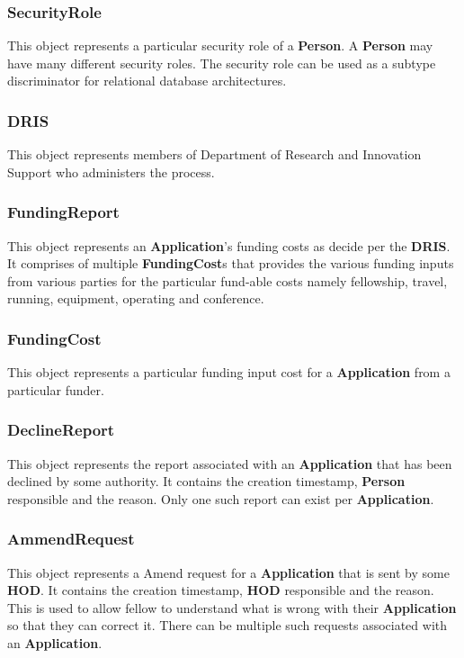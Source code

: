 \documentclass[12pt]{article}
\begin{document}
\subsubsection{SecurityRole}
This object represents a particular security role of a \textbf{Person}. A \textbf{Person} may have many different security roles. The security role can be used as a subtype discriminator for relational database architectures.

\subsubsection{DRIS}
This object represents members of Department of Research and Innovation Support who administers the process.

\subsubsection{FundingReport}
This object represents an \textbf{Application}'s funding costs as decide per the \textbf{DRIS}. It comprises of multiple \textbf{FundingCost}s that provides the various funding inputs from various parties for the particular fund-able costs namely fellowship, travel, running, equipment, operating
and conference.
 
\subsubsection{FundingCost}
This object represents a particular funding input cost for a \textbf{Application} from a particular funder. 

\subsubsection{DeclineReport}
This object represents the report associated with an \textbf{Application} that has been declined by some authority. It contains the creation timestamp, \textbf{Person} responsible and the reason. Only one such report can exist per \textbf{Application}.

\subsubsection{AmmendRequest}
This object represents a Amend request for a \textbf{Application} that is sent by some \textbf{HOD}. It contains the creation timestamp, \textbf{HOD} responsible and the reason. This is used to allow fellow to understand what is wrong with their \textbf{Application} so that they can correct it. There can be multiple such requests associated with an \textbf{Application}.
\end{document}
